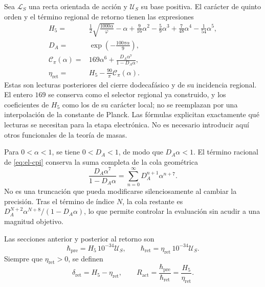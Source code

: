 Sea \(\mathcal L_S\) una recta orientada de acción y \(\mathcal U_S\)
su base positiva. El carácter de quinto orden y el término regional de
retorno tienen las expresiones
\begin{align}
 H_5={}&\frac12\sqrt{\frac{1000\alpha}{\varphi}}-\alpha
   +\frac9{16}\alpha^2-\frac59\alpha^3
   +\frac7{48}\alpha^4-\frac1{54}\alpha^5,
   \label{eq:el-h5}\\
 D_A={}&\exp\!\left(-\frac{100\pi\alpha}{9}\right),
   \label{eq:el-da}\\
 \mathcal C_\pi(\alpha)={}&169\alpha^6+
       \frac{D_A\alpha^7}{1-D_A\alpha},
   \label{eq:el-cpi}\\
 \eta_{\mathrm{ret}}={}&H_5-\frac{90}{\pi}\mathcal C_\pi(\alpha).
   \label{eq:el-eta}
\end{align}
Estas son lecturas posteriores del cierre dodecafásico y de su
incidencia regional. El entero \(169\) se conserva como el selector
regional ya construido, y los coeficientes de \(H_5\) como los de su
carácter local; no se reemplazan por una interpolación de la constante de
Planck. Las fórmulas explicitan exactamente qué lecturas se necesitan
para la etapa electrónica. No es necesario introducir aquí otros
funcionales de la teoría de masas.

Para \(0<\alpha<1\), se tiene \(0<D_A<1\), de modo que
\(D_A\alpha<1\). El término racional de \eqref{eq:el-cpi} conserva la
suma completa de la cola geométrica
\begin{equation}
 \frac{D_A\alpha^7}{1-D_A\alpha}
 =\sum_{n=0}^{\infty}D_A^{n+1}\alpha^{n+7}.
 \label{eq:el-cola-regional}
\end{equation}
No es una truncación que pueda modificarse silenciosamente al cambiar la
precisión. Tras el término de índice \(N\), la cola restante es
\(D_A^{N+2}\alpha^{N+8}/(1-D_A\alpha)\), lo que permite controlar la
evaluación sin acudir a una magnitud objetivo.

\begin{definition}
Las secciones anterior y posterior al retorno son
\begin{equation}
 \hbar_{\mathrm{pre}}=H_5\,10^{-34}\mathcal U_S,
 \qquad
 \hbar_{\mathrm{ret}}=\eta_{\mathrm{ret}}\,10^{-34}\mathcal U_S.
 \label{eq:el-secciones-accion}
\end{equation}
Siempre que \(\eta_{\mathrm{ret}}>0\), se definen
\begin{equation}
 \delta_{\mathrm{ret}}=H_5-\eta_{\mathrm{ret}},\qquad
 R_{\mathrm{act}}=\frac{\hbar_{\mathrm{pre}}}{\hbar_{\mathrm{ret}}}
 =\frac{H_5}{\eta_{\mathrm{ret}}}.
 \label{eq:el-ratio}
\end{equation}
\end{definition}

